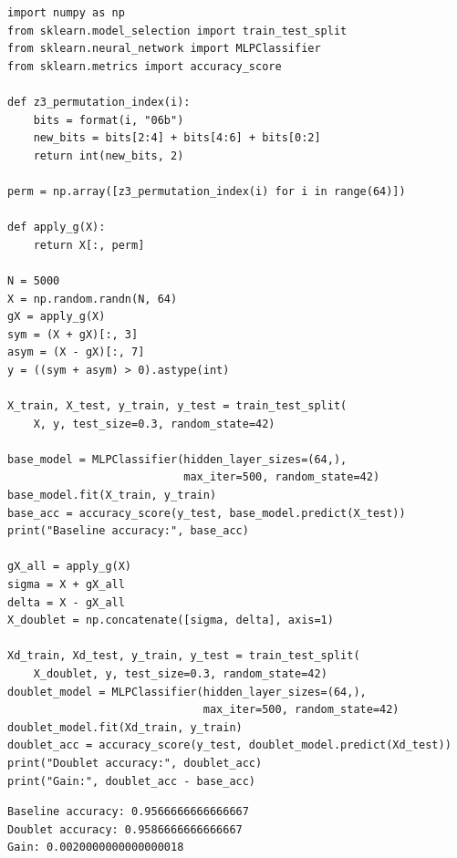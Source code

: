 \documentclass[11pt,a4paper]{report}
\begin{document}
\label{app:ch3-lst1}
\begin{lstlisting}[caption=SBOHN Experiment 1: doublet with MLP]
import numpy as np
from sklearn.model_selection import train_test_split
from sklearn.neural_network import MLPClassifier
from sklearn.metrics import accuracy_score

def z3_permutation_index(i):
    bits = format(i, "06b")
    new_bits = bits[2:4] + bits[4:6] + bits[0:2]
    return int(new_bits, 2)

perm = np.array([z3_permutation_index(i) for i in range(64)])

def apply_g(X):
    return X[:, perm]

N = 5000
X = np.random.randn(N, 64)
gX = apply_g(X)
sym = (X + gX)[:, 3]
asym = (X - gX)[:, 7]
y = ((sym + asym) > 0).astype(int)

X_train, X_test, y_train, y_test = train_test_split(
    X, y, test_size=0.3, random_state=42)

base_model = MLPClassifier(hidden_layer_sizes=(64,),
                           max_iter=500, random_state=42)
base_model.fit(X_train, y_train)
base_acc = accuracy_score(y_test, base_model.predict(X_test))
print("Baseline accuracy:", base_acc)

gX_all = apply_g(X)
sigma = X + gX_all
delta = X - gX_all
X_doublet = np.concatenate([sigma, delta], axis=1)

Xd_train, Xd_test, y_train, y_test = train_test_split(
    X_doublet, y, test_size=0.3, random_state=42)
doublet_model = MLPClassifier(hidden_layer_sizes=(64,),
                              max_iter=500, random_state=42)
doublet_model.fit(Xd_train, y_train)
doublet_acc = accuracy_score(y_test, doublet_model.predict(Xd_test))
print("Doublet accuracy:", doublet_acc)
print("Gain:", doublet_acc - base_acc)
\end{lstlisting}

\label{app:ch3-lst2}
\begin{lstlisting}[style=textstyle, caption=Result of SBOHN-1 experiment]
Baseline accuracy: 0.9566666666666667
Doublet accuracy: 0.9586666666666667
Gain: 0.0020000000000000018
\end{lstlisting}
\end{document}
